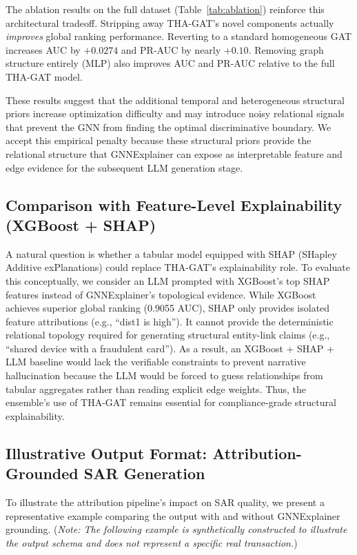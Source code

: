 \documentclass[journal]{IEEEtran}
\begin{document}
The ablation results on the full dataset (Table~\ref{tab:ablation}) reinforce this architectural tradeoff. Stripping away THA-GAT's novel components actually \emph{improves} global ranking performance. Reverting to a standard homogeneous GAT increases AUC by $+0.0274$ and PR-AUC by nearly $+0.10$. Removing graph structure entirely (MLP) also improves AUC and PR-AUC relative to the full THA-GAT model.

These results suggest that the additional temporal and heterogeneous structural priors increase optimization difficulty and may introduce noisy relational signals that prevent the GNN from finding the optimal discriminative boundary. We accept this empirical penalty because these structural priors provide the relational structure that GNNExplainer can expose as interpretable feature and edge evidence for the subsequent LLM generation stage.

\subsection{Comparison with Feature-Level Explainability (XGBoost + SHAP)}
A natural question is whether a tabular model equipped with SHAP (SHapley Additive exPlanations) could replace THA-GAT's explainability role. To evaluate this conceptually, we consider an LLM prompted with XGBoost's top SHAP features instead of GNNExplainer's topological evidence. While XGBoost achieves superior global ranking (0.9055 AUC), SHAP only provides isolated feature attributions (e.g., ``dist1 is high''). It cannot provide the deterministic relational topology required for generating structural entity-link claims (e.g., ``shared device with a fraudulent card''). As a result, an XGBoost + SHAP + LLM baseline would lack the verifiable constraints to prevent narrative hallucination because the LLM would be forced to guess relationships from tabular aggregates rather than reading explicit edge weights. Thus, the ensemble's use of THA-GAT remains essential for compliance-grade structural explainability.

\subsection{Illustrative Output Format: Attribution-Grounded SAR Generation}

To illustrate the attribution pipeline's impact on SAR quality, we present a representative example comparing the output with and without GNNExplainer grounding. (\emph{Note: The following example is synthetically constructed to illustrate the output schema and does not represent a specific real transaction.})
\end{document}
